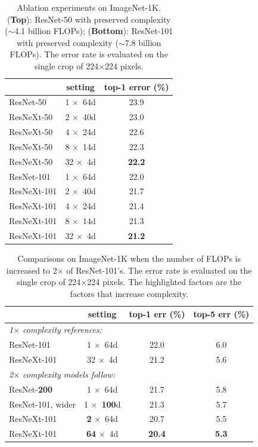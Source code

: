 \documentclass[10pt,twocolumn,letterpaper]{article}
\newcommand{\m}{$\times$}
\begin{document}
\renewcommand\arraystretch{1.1}
\setlength{\tabcolsep}{12pt}
\begin{table}[t]
\begin{center}
\small
\begin{tabular}{l|c|c}
\hline
	& setting & \footnotesize top-1 error (\%) \\
\hline
ResNet-50		& 1 \m~64d		& 23.9 \\
ResNeXt-50		& 2 \m~40d		& 23.0 \\
ResNeXt-50		& 4 \m~24d		& 22.6 \\
ResNeXt-50		& 8 \m~14d		& 22.3 \\
ResNeXt-50		& 32 \m~4d		& \textbf{22.2} \\
\hline
ResNet-101		& 1 \m~64d		& 22.0 \\
ResNeXt-101	& 2 \m~40d		& 21.7 \\
ResNeXt-101	& 4 \m~24d		& 21.4 \\
ResNeXt-101	& 8 \m~14d		& 21.3 \\
ResNeXt-101	& 32 \m~4d		& \textbf{21.2} \\
\hline
\end{tabular}
\end{center}
\caption{Ablation experiments on ImageNet-1K. (\textbf{Top}): ResNet-50 with preserved complexity ($\sim$4.1 billion FLOPs); (\textbf{Bottom}): ResNet-101 with preserved complexity ($\sim$7.8 billion FLOPs). The error rate is evaluated on the single crop of 224$\times$224 pixels.}
\label{tab:preserve-comp}
\end{table}

\renewcommand\arraystretch{1.1}
\setlength{\tabcolsep}{4pt}
\begin{table}[t]
\begin{center}
\small
\begin{tabular}{l|c|c|c}
\hline
	& \footnotesize setting
	& \footnotesize  top-1 err (\%)
	& \footnotesize  top-5 err (\%) \\
\hline
\multicolumn{4}{l}{\emph{1$\times$ complexity references:}} \\
\hline
ResNet-101												& 1 \m~64d					& 22.0 				& 6.0 \\
ResNeXt-101												& 32 \m~4d					& 21.2 				& 5.6 \\
\hline
\multicolumn{4}{l}{\emph{2$\times$ complexity models follow:}} \\
\hline
ResNet-\textbf{200} \cite{He2016a}		& 1 \m~64d					& 21.7				& 5.8 \\
ResNet-101, wider									& 1 \m~\textbf{100}d	& 21.3 				& 5.7 \\
\hline
ResNeXt-101								& \textbf{2} \m~64d					& 20.7	& 5.5 \\
ResNeXt-101								& \textbf{64}	 \m~4d					& \textbf{20.4}	& \textbf{5.3} \\
\hline
\end{tabular}
\end{center}
\caption{Comparisons on ImageNet-1K when the number of FLOPs is increased to 2$\times$ of ResNet-101's.
The error rate is evaluated on the single crop of 224$\times$224 pixels. The highlighted factors are the factors that increase complexity.}
\label{tab:2x-complexity}
\end{table}
\end{document}
